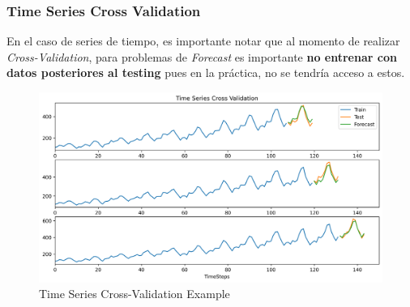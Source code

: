 \subsubsection{Time Series Cross Validation}

En el caso de series de tiempo, es importante notar que al momento de realizar \textit{Cross-Validation}, para problemas de \textit{Forecast} es importante \textbf{no entrenar con datos posteriores al testing} pues en la práctica, no se tendría acceso a estos.

\begin{figure}[H]
    \center
    \includegraphics[scale=0.45]{notebooks/Others/img/time_series_cross_validation.png}
    \caption{Time Series Cross-Validation Example}
\end{figure}








